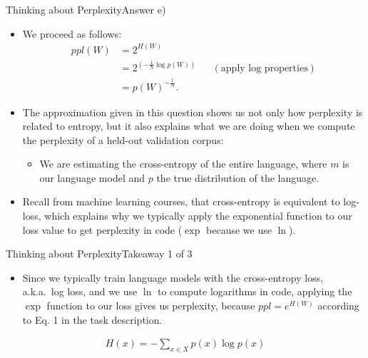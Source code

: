 \documentclass[t]{beamer}
\begin{document}
\begin{frame}{Thinking about Perplexity}{Answer e)}
    \begin{itemize}
        \item We proceed as follows:
              \begin{align*}
                  ppl(W) & = 2^{H(W)}                                                                   \\
                         & = 2^{\left(-\frac{1}{N} \log p(W)\right)} &  & (\text{apply log properties}) \\
                         & = p(W)^{-\frac{1}{N}}.
              \end{align*}
        \item The approximation given in this question shows us not only how
              perplexity is related to entropy, but it also explains what we are
              doing when we compute the perplexity of a held-out validation
              corpus:
              \begin{itemize}
                  \item We are estimating the cross-entropy of the entire
                        language, where $m$ is our language model and $p$ the
                        true distribution of the language.
              \end{itemize}
        \item Recall from machine learning courses, that cross-entropy is
              equivalent to log-loss, which explains why we typically apply the
              exponential function to our loss value to get perplexity in code
              ($\exp$ because we use $\ln$).
    \end{itemize}
\end{frame}

\begin{frame}{Thinking about Perplexity}{Takeaway 1 of 3}
    \begin{itemize}
        \item Since we typically train language models with the cross-entropy
              loss, a.k.a.\ log loss, and we use $\ln$ to compute logarithms in
              code, applying the $\exp$ function to our loss gives us
              perplexity, because $ppl = e^{H(W)}$ according to Eq. 1 in the
              task description.
    \end{itemize}
    \begin{align*}
        H(x) = -\sum_{x\in X} p(x)\log p(x)
    \end{align*}
\end{frame}
\end{document}
